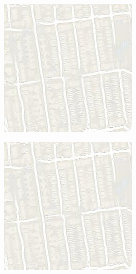 \begin{figure}[ht]
\begin{subfigure}[t]{.14\textwidth}
  \end{subfigure}
  \begin{subfigure}[t]{.14\textwidth}
    \centering
    \includegraphics[width=\linewidth]{images/cycleGanResults/Maps19Ld120_E100_Lr0002.jpg}
  \end{subfigure}
  \hfill
  \begin{subfigure}[t]{.14\textwidth}
    \centering
    \includegraphics[width=\linewidth]{images/cycleGanResults/Maps19Ld120_E100_Lr0002.jpg}

\end{subfigure}
\end{figure}
